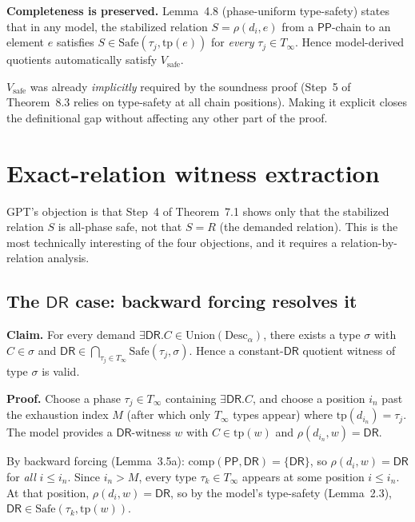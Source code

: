 \documentclass[11pt]{article}
\begin{document}
\textbf{Completeness is preserved.}\; Lemma~4.8 (phase-uniform
type-safety) states that in any model, the stabilized relation
$S = \rho(d_i, e)$ from a $\mathsf{PP}$-chain to an element $e$
satisfies $S \in \mathrm{Safe}(\tau_j, \mathrm{tp}(e))$ for
\emph{every} $\tau_j \in T_\infty$.  Hence model-derived quotients
automatically satisfy $V_{\mathrm{safe}}$.

$V_{\mathrm{safe}}$ was already \emph{implicitly} required by the
soundness proof (Step~5 of Theorem~8.3 relies on type-safety at all
chain positions).  Making it explicit closes the definitional gap
without affecting any other part of the proof.


\section{Exact-relation witness extraction}
\label{sec:o2}

GPT's objection is that Step~4 of Theorem~7.1 shows only that the
stabilized relation $S$ is all-phase safe, not that $S = R$ (the
demanded relation).  This is the most technically interesting of the
four objections, and it requires a relation-by-relation analysis.

\subsection{The $\mathsf{DR}$ case: backward forcing resolves it}

\textbf{Claim.}\; For every demand
$\exists\mathsf{DR}.C \in \mathrm{Union}(\mathrm{Desc}_\alpha)$,
there exists a type $\sigma$ with $C \in \sigma$ and
$\mathsf{DR} \in \bigcap_{\tau_j \in T_\infty}
\mathrm{Safe}(\tau_j, \sigma)$.  Hence a constant-$\mathsf{DR}$
quotient witness of type $\sigma$ is valid.

\textbf{Proof.}\; Choose a phase $\tau_j \in T_\infty$ containing
$\exists\mathsf{DR}.C$, and choose a position $i_n$ past the
exhaustion index $M$ (after which only $T_\infty$ types appear)
where $\mathrm{tp}(d_{i_n}) = \tau_j$.  The model provides a
$\mathsf{DR}$-witness $w$ with $C \in \mathrm{tp}(w)$ and
$\rho(d_{i_n}, w) = \mathsf{DR}$.

By backward forcing (Lemma~3.5a):
$\mathrm{comp}(\mathsf{PP}, \mathsf{DR}) = \{\mathsf{DR}\}$, so
$\rho(d_i, w) = \mathsf{DR}$ for \emph{all} $i \le i_n$.  Since
$i_n > M$, every type $\tau_k \in T_\infty$ appears at some
position $i \le i_n$.  At that position, $\rho(d_i, w) = \mathsf{DR}$,
so by the model's type-safety (Lemma~2.3),
$\mathsf{DR} \in \mathrm{Safe}(\tau_k, \mathrm{tp}(w))$.
\end{document}

